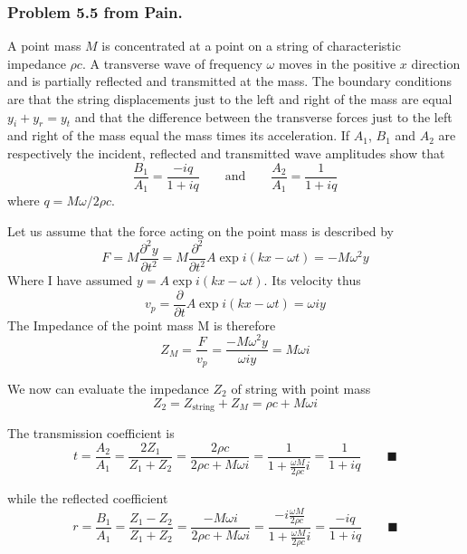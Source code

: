 \documentclass[../../../main.tex]{subfiles}
\begin{document}
\subsubsection{Problem 5.5 from Pain.} A point mass $M$ is concentrated at a point on a string of characteristic impedance $\rho c$. A transverse wave of frequency $\omega$ moves in the positive $x$ direction and is partially reflected and transmitted at the mass. The boundary conditions are that the string displacements just to the left and right of the mass are equal $y_i+y_r=y_t$ and that the difference between the transverse forces just to the left and right of the mass equal the mass times its acceleration. If $A_1$, $B_1$ and $A_2$ are respectively the incident, reflected and transmitted wave amplitudes show that
\begin{equation*}
    \frac{B_1}{A_1}=\frac{-iq}{1+iq}\qquad \text{and}\qquad \frac{A_2}{A_1}=\frac{1}{1+iq}
\end{equation*}
where $q=M\omega/ 2\rho c$. 

Let us assume that the force acting on the point mass is described by
\begin{equation*}
    F=M\frac{\partial^2 y}{\partial t^2}=M \frac{\partial^2 }{\partial t^2} A\exp i(kx-\omega t)=-M\omega^2 y
\end{equation*}
Where I have assumed $y=A \exp i(kx-\omega t)$. Its velocity thus
\begin{equation*}
    v_p=\frac{\partial }{\partial t} A\exp i(kx-\omega t)=\omega i y
\end{equation*}
The Impedance of the point mass M is therefore
\begin{equation*}
    Z_M=\frac{F}{v_p}=\frac{-M\omega^2 y}{\omega i y}=M\omega i
\end{equation*}

We now can evaluate the impedance $Z_2$ of string with point mass
\begin{equation*}
    Z_2=Z_{\text{string}}+Z_M=\rho c+M\omega i
\end{equation*}

The transmission coefficient is
\begin{equation*}
    t=\frac{A_2}{A_1}=\frac{2Z_1}{Z_1+Z_2}=\frac{2\rho c}{2\rho c+M\omega i}=\frac{1}{1+\frac{\omega M}{2\rho c}i}=\frac{1}{1+iq}\qquad \blacksquare
\end{equation*}

while the reflected coefficient
\begin{equation*}
    r=\frac{B_1}{A_1}=\frac{Z_1-Z_2}{Z_1+Z_2}=\frac{-M\omega i}{2\rho c+M\omega i}=\frac{-i\frac{\omega M}{2\rho c}}{1+\frac{\omega M}{2\rho c}i}=\frac{-iq}{1+iq}\qquad \blacksquare
\end{equation*}
\end{document}
